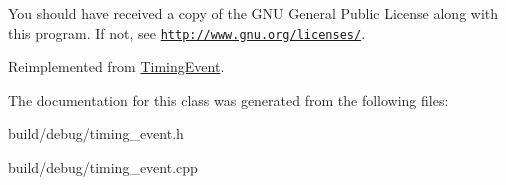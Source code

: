 You should have received a copy of the G\-N\-U General Public License along with this program. If not, see \href{http://www.gnu.org/licenses/}{\tt http\-://www.\-gnu.\-org/licenses/}. 

Reimplemented from \hyperlink{classTimingEvent_a55e7e2942d6607eb2a9dd484baf39070}{Timing\-Event}.



The documentation for this class was generated from the following files\-:\begin{DoxyCompactItemize}
\item 
build/debug/timing\-\_\-event.\-h\item 
build/debug/timing\-\_\-event.\-cpp\end{DoxyCompactItemize}
